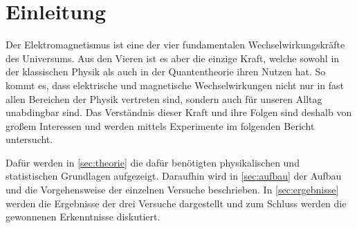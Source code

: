 \section{Einleitung}
\label{sec:einleitung}

Der Elektromagnetismus ist eine der vier fundamentalen Wechselwirkungskräfte des Universums. Aus den Vieren ist es aber die einzige Kraft, welche sowohl in der klassischen Physik als auch in der Quantentheorie ihren Nutzen hat. So kommt es, dass elektrische und magnetische Wechselwirkungen nicht nur in fast allen Bereichen der Physik vertreten sind, sondern auch für unseren Alltag unabdingbar sind. Das Verständnis dieser Kraft und ihre Folgen sind deshalb von großem Interessen und werden mittels Experimente im folgenden Bericht untersucht. 

Dafür werden in \autoref{sec:theorie} die dafür benötigten physikalischen und statistischen Grundlagen aufgezeigt. Daraufhin wird in \autoref{sec:aufbau} der Aufbau und die Vorgehensweise der einzelnen Versuche beschrieben. In \autoref{sec:ergebnisse} werden die Ergebnisse der drei Versuche dargestellt und zum Schluss werden die gewonnenen Erkenntnisse diskutiert.